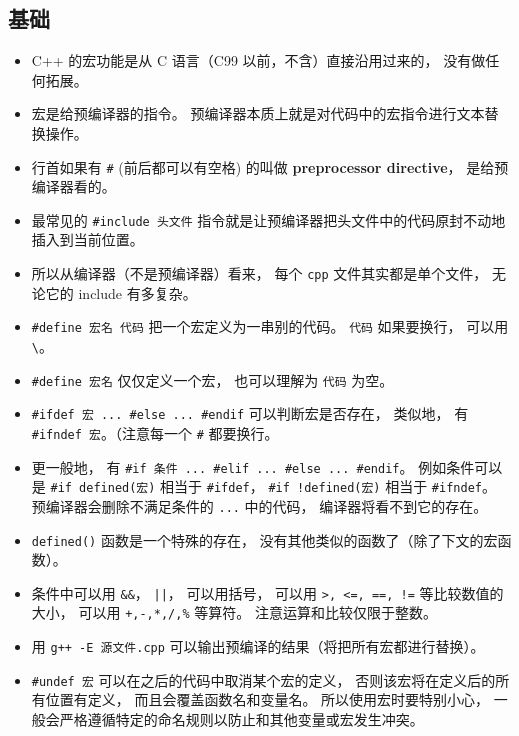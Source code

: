
\begin{issues}
\issueDraft
\end{issues}


\subsection{基础}
\begin{itemize}
\item C++ 的宏功能是从 C 语言（C99 以前，不含）直接沿用过来的， 没有做任何拓展。
\item 宏是给预编译器的指令。 预编译器本质上就是对代码中的宏指令进行文本替换操作。
\item 行首如果有 \verb|#| (前后都可以有空格) 的叫做 \textbf{preprocessor directive}， 是给预编译器看的。
\item 最常见的 \verb|#include 头文件| 指令就是让预编译器把头文件中的代码原封不动地插入到当前位置。
\item 所以从编译器（不是预编译器）看来， 每个 \verb|cpp| 文件其实都是单个文件， 无论它的 include 有多复杂。
\item \verb|#define 宏名 代码| 把一个宏定义为一串别的代码。 \verb|代码| 如果要换行， 可以用 \verb|\|。
\item \verb|#define 宏名| 仅仅定义一个宏， 也可以理解为 \verb|代码| 为空。
\item \verb|#ifdef 宏 ... #else ... #endif| 可以判断宏是否存在， 类似地， 有 \verb|#ifndef 宏|。（注意每一个 \verb|#| 都要换行。
\item 更一般地， 有 \verb|#if 条件 ... #elif ... #else ... #endif|。 例如条件可以是 \verb|#if defined(宏)| 相当于 \verb|#ifdef|， \verb|#if !defined(宏)| 相当于 \verb|#ifndef|。 预编译器会删除不满足条件的 \verb|...| 中的代码， 编译器将看不到它的存在。
\item \verb|defined()| 函数是一个特殊的存在， 没有其他类似的函数了（除了下文的宏函数）。
\item 条件中可以用 \verb|&&|， \verb`||`， 可以用括号， 可以用 \verb|>, <=, ==, !=| 等比较数值的大小， 可以用 \verb|+,-,*,/,%| 等算符。 注意运算和比较仅限于整数。
\item 用 \verb|g++ -E 源文件.cpp| 可以输出预编译的结果（将把所有宏都进行替换）。
\item \verb|#undef 宏| 可以在之后的代码中取消某个宏的定义， 否则该宏将在定义后的所有位置有定义， 而且会覆盖函数名和变量名。 所以使用宏时要特别小心， 一般会严格遵循特定的命名规则以防止和其他变量或宏发生冲突。

\end{itemize}
